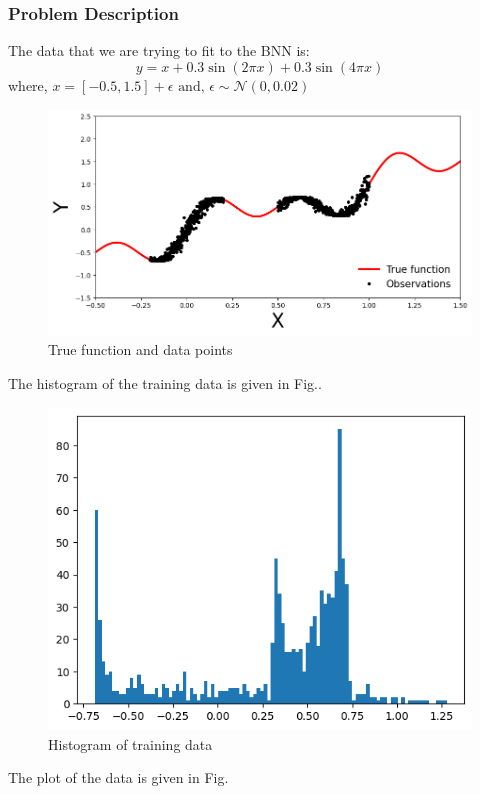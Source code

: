 \documentclass[11pt,a4paper]{article}
\begin{document}
\subsubsection{Problem Description}
The data that we are trying to fit to the BNN is:
\begin{equation}
    y = x + 0.3 \sin(2 \pi x) + 0.3 \sin(4 \pi x)
\end{equation}
where, 
\begin{math}
    x = [-0.5,1.5] + \epsilon \text{ and, }
    \epsilon \sim \mathcal{N}(0,0.02)
\end{math}

\begin{figure}[h!]
    \centering
    \includegraphics[scale=0.5]{original data.png}
    \caption{True function and data points}
    \label{fig:train data}
\end{figure}
The histogram of the training data is given in Fig.\fbox{ \ref{fig:train data hist}}.
\begin{figure}[h!]
    \centering
    \includegraphics[scale = 0.5]{original data hist.png}
    \caption{Histogram of training data}
    \label{fig:train data hist}
\end{figure}
The plot of the data is given in Fig.\fbox{ \ref{fig:train data}}
\end{document}
